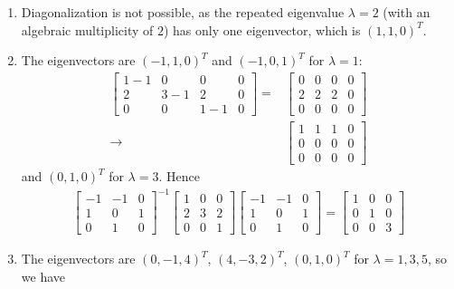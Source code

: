 \begin{Answer}
\begin{enumerate}[label=(\alph*)]
\item Diagonalization is not possible, as the repeated eigenvalue $\lambda = 2$ (with an algebraic multiplicity of $2$) has only one eigenvector, which is $(1,1,0)^T$.
\item The eigenvectors are $(-1,1,0)^T$ and $(-1,0,1)^T$ for $\lambda = 1$:
\begin{align*}
\left[
\begin{array}{ccc|c}
1-1 & 0 & 0 & 0\\
2 & 3-1 & 2 & 0\\
0 & 0 & 1-1 & 0
\end{array}
\right]    
=&
\left[
\begin{array}{ccc|c}
0 & 0 & 0 & 0\\
2 & 2 & 2 & 0\\
0 & 0 & 0 & 0
\end{array}
\right] \\
\to &
\left[
\begin{array}{ccc|c}
1 & 1 & 1 & 0\\
0 & 0 & 0 & 0\\
0 & 0 & 0 & 0
\end{array}
\right]
\end{align*}
and $(0,1,0)^T$ for $\lambda = 3$. Hence 
\begin{align*}
\begin{bmatrix}
-1 & -1 & 0\\
1 & 0 & 1\\
0 & 1 & 0
\end{bmatrix}^{-1}
\begin{bmatrix}
1 & 0 & 0\\
2 & 3 & 2\\
0 & 0 & 1
\end{bmatrix}
\begin{bmatrix}
-1 & -1 & 0\\
1 & 0 & 1\\
0 & 1 & 0
\end{bmatrix}
=
\begin{bmatrix}
1 & 0 & 0\\
0 & 1 & 0\\
0 & 0 & 3  
\end{bmatrix}
\end{align*}
\item The eigenvectors are $(0,-1,4)^T$, $(4,-3,2)^T$, $(0,1,0)^T$ for $\lambda = 1,3,5$, so we have
\begin{align*}

\end{align*}
\end{enumerate}
\end{Answer}
